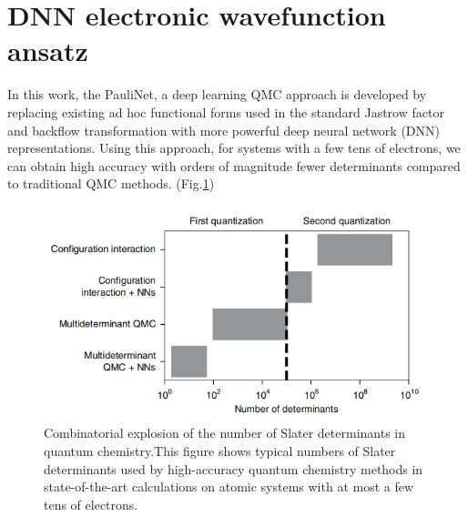 \documentclass[12pt]{article}
\begin{document}
\section{\large DNN electronic wavefunction ansatz}

In this work, the PauliNet, a deep learning QMC approach is developed by replacing 
existing ad hoc functional forms used in the standard Jastrow factor and backflow 
transformation with more powerful deep neural network (DNN) representations. Using 
this approach, for systems with a few tens of electrons, we can obtain high accuracy 
with orders of magnitude fewer determinants compared to traditional QMC methods.
(Fig.\ref{img1})
\begin{figure}[H]
    \centering
    \includegraphics[width=13cm]{p1.png}
    \renewcommand{\figurename}{Fig.}
    \caption{Combinatorial explosion of the number of Slater determinants in 
    quantum chemistry.This figure shows typical numbers of Slater determinants 
    used by high-accuracy quantum chemistry methods in state-of-the-art 
    calculations on atomic systems with at most a few tens of electrons.}
    \label{img1}
\end{figure}
\end{document}
